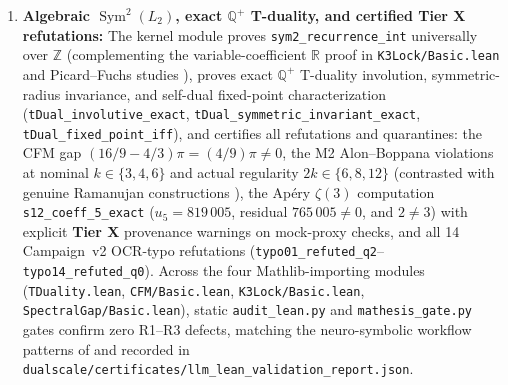 \documentclass[11pt,a4paper]{article}
\theoremstyle{plain}
\theoremstyle{definition}
\theoremstyle{remark}
\newcommand{\tierA}{\textbf{Tier A}}
\newcommand{\tierX}{\textbf{Tier X}}
\begin{document}
\begin{enumerate}
    Eight universal \texttt{EtaQuot} theorems (\texttt{weight2\_append}, \texttt{weight2\_invert}, \texttt{onoSumDR\_append}, \texttt{onoSumDR\_invert}, \texttt{onoSumNOverDR\_append}, \texttt{onoSumNOverDR\_invert}, \texttt{onoMod24\_closed\_append}, \texttt{onoMod24\_closed\_invert}) verify closure of Ono's Theorem~1.64 conditions \cite{Ono2004} under multiplication and inversion, aligning with $\eta$-quotient generation and cuspidal structure theory \cite{RouseWebb2015, AcresBroadhurst2018, Bhattacharya2026}. Six live kernel theorems (\texttt{deepBurn\_ceff\_cusp0}, \texttt{deepBurn\_weight}, \texttt{deepBurn\_E0}, \texttt{deepBurn\_ono\_false}, \texttt{deepBurn\_prefix\_10}, \texttt{deepBurn\_has\_negative\_coeff}) upgrade the RAMA Deep Burn invariants ($c_{\text{eff}}(0) = -823/2310 < 0$, $k = -183/2$, $E_0 = 425/6$, non-modular, negative $q^1$ coefficient $-24$) to \tierA{}, situating mock-theta and BPS asymptotics within \cite{MalmendierOno2012, BallantineBursonFolsom2022, CostinDunneSaraeb2026, DMZ2012, CDH2014}.
  \item \textbf{Algebraic $\operatorname{Sym}^2(L_2)$, exact $\mathbb{Q}^+$ T-duality, and certified \tierX{} refutations:}
    The kernel module proves \texttt{sym2\_recurrence\_int} universally over $\mathbb{Z}$ (complementing the variable-coefficient $\mathbb{R}$ proof in \texttt{K3Lock/Basic.lean} and Picard--Fuchs studies \cite{AlmkvistZudilin2005, DoranHarderThompson2016}), proves exact $\mathbb{Q}^+$ T-duality involution, symmetric-radius invariance, and self-dual fixed-point characterization (\texttt{tDual\_involutive\_exact}, \texttt{tDual\_symmetric\_invariant\_exact}, \texttt{tDual\_fixed\_point\_iff}), and certifies all refutations and quarantines: the CFM gap $(16/9 - 4/3)\pi = (4/9)\pi \neq 0$, the M2 Alon--Boppana violations at nominal $k \in \{3,4,6\}$ and actual regularity $2k \in \{6,8,12\}$ (contrasted with genuine Ramanujan constructions \cite{MSS2015}), the Ap\'{e}ry $\zeta(3)$ computation \texttt{s12\_coeff\_5\_exact} ($u_5 = 819\,005$, residual $765\,005 \neq 0$, and $2 \neq 3$) with explicit \tierX{} provenance warnings on mock-proxy checks, and all 14 Campaign~v2 OCR-typo refutations (\texttt{typo01\_refuted\_q2}--\texttt{typo14\_refuted\_q0}). Across the four Mathlib-importing modules (\texttt{TDuality.lean}, \texttt{CFM/Basic.lean}, \texttt{K3Lock/Basic.lean}, \texttt{SpectralGap/Basic.lean}), static \texttt{audit\_lean.py} and \texttt{mathesis\_gate.py} gates confirm zero R1--R3 defects, matching the neuro-symbolic workflow patterns of \cite{Yang2023LeanDojo, Song2024LeanCopilot, Xin2024DeepSeekProver, Kripner2026OpenProver} and recorded in \texttt{dualscale/certificates/llm\_lean\_validation\_report.json}.
\end{enumerate}
\end{document}
